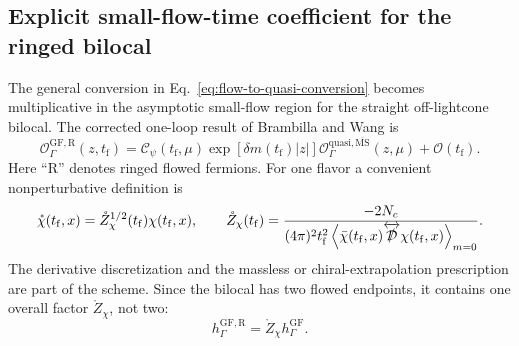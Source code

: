 \documentclass[11pt]{article}
\numberwithin{equation}{section}
\newcommand{\MSbar}{\overline{\mathrm{MS}}}
\newcommand{\cO}{\mathcal{O}}
\newcommand{\tf}{t_{\mathrm f}}
\begin{document}
\subsection{Explicit small-flow-time coefficient for the ringed bilocal}
\label{sec:explicit-sfte}

The general conversion in Eq.~\eqref{eq:flow-to-quasi-conversion} becomes
multiplicative in the asymptotic small-flow region for the straight
off-lightcone bilocal.  The corrected one-loop result of Brambilla and Wang
\cite{BrambillaWang2024} is
\begin{equation}
  \cO_{\Gamma}^{\mathrm{GF,R}}(z,\tf)
  =
  \mathcal C_\psi(\tf,\mu)
  \exp\!\left[\delta m(\tf)|z|\right]
  \cO_{\Gamma}^{\mathrm{quasi},\MSbar}(z,\mu)
  +\cO(\tf).
  \label{eq:explicit-sfte-operator}
\end{equation}
Here ``R'' denotes ringed flowed fermions.  For one flavor a convenient
nonperturbative definition is
\begin{equation}
  \mathring\chi(\tf,x)
  =\mathring Z_\chi^{1/2}(\tf)\chi(\tf,x),
  \qquad
  \mathring Z_\chi(\tf)
  =
  \frac{-2N_c}
  {(4\pi)^2\tf^2
   \left\langle
     \bar\chi(\tf,x)
     \overleftrightarrow{\slashed{\mathcal D}}
     \chi(\tf,x)
   \right\rangle_{m=0}}.
  \label{eq:ringed-zchi-nonperturbative}
\end{equation}
The derivative discretization and the massless or chiral-extrapolation
prescription are part of the scheme.  Since the bilocal has two flowed
endpoints, it contains one overall factor \(\mathring Z_\chi\), not two:
\begin{equation}
  h_\Gamma^{\mathrm{GF,R}}
  =\mathring Z_\chi h_\Gamma^{\mathrm{GF}}.
  \label{eq:ringed-bilocal-factor}
\end{equation}
\end{document}
